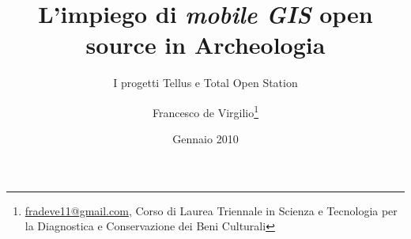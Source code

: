 \documentclass{paper}
\begin{document}

\renewcommand{\nameyeardelim}{, }

\renewcommand{\bibleftparen}{}
\renewcommand{\bibrightparen}{}

\renewcommand*{\newunitpunct}{\addcomma\space}




\title{L'impiego di \emph{mobile GIS} open source in Archeologia}

\subtitle{I progetti Tellus e Total Open Station}

\author{Francesco de Virgilio\thanks{\protect\href{mailto:fradeve11@gmail.com}{fradeve11@gmail.com}, Corso di Laurea Triennale in Scienza e Tecnologia per la Diagnostica e Conservazione dei Beni Culturali}}


\date{Gennaio 2010}
\maketitle
\end{document}
